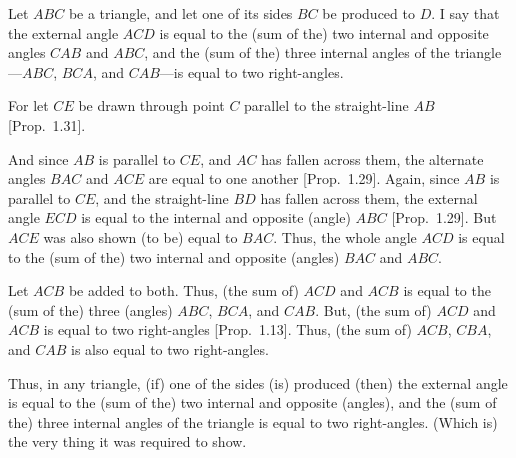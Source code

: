 \begin{Parallel}{}{}
{\epsfysize=2in
\centerline{}

Let $ABC$ be a triangle, and let one of its sides $BC$ be produced to $D$.
I say that the external angle $ACD$ is equal to the (sum of the) two internal and opposite
angles $CAB$ and $ABC$, and the (sum of the) three internal angles of the triangle---$ABC$, $BCA$, and $CAB$---is equal to two right-angles.

For let $CE$ be drawn through point $C$ parallel to the straight-line
$AB$ [Prop.~1.31].

And since $AB$ is parallel to $CE$, and $AC$ has fallen across them, the alternate
angles $BAC$ and $ACE$ are equal to one another [Prop.~1.29]. Again,
since $AB$ is parallel to $CE$, and the straight-line $BD$ has fallen across them, 
the external angle $ECD$ is equal to the internal and opposite (angle)
$ABC$ [Prop.~1.29]. But $ACE$ was also shown (to be) equal to $BAC$. Thus, the whole
angle $ACD$ is equal to the (sum of the) two internal and opposite (angles) $BAC$ and $ABC$.

Let $ACB$ be added to both. Thus, (the sum of) $ACD$ and $ACB$ is equal to
the (sum of the) three (angles) $ABC$, $BCA$, and $CAB$. But, (the sum of) $ACD$ and $ACB$ is equal
to two right-angles [Prop.~1.13]. Thus, (the sum of) $ACB$, $CBA$, and $CAB$ is also
equal to two right-angles.

Thus, in any triangle,  (if) one of the sides  (is) produced (then) the external
angle is equal to the (sum of the) two internal and opposite (angles), and the (sum of the) three
internal angles of the triangle is equal to two right-angles. (Which is)
the very thing it was required to show.}
\end{Parallel}

